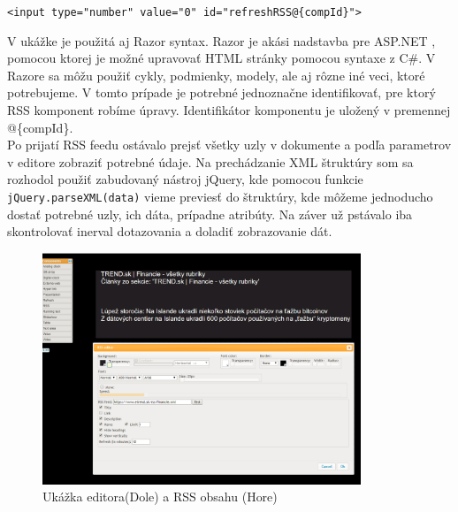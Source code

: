 \documentclass[11pt, oneside]{report}
\begin{document}
\begin{center}
\lstset{language=HTML5}
\lstinline!<input type="number" value="0" id="refreshRSS@{compId}">!\\
\end{center}
V ukážke je použitá aj Razor syntax. Razor je  akási nadstavba pre ASP.NET , pomocou ktorej je možné upravovať HTML stránky pomocou syntaxe z C\#. V Razore  sa môžu použiť cykly, podmienky, modely, ale aj rôzne iné veci, ktoré potrebujeme. V tomto prípade je potrebné jednoznačne identifikovať, pre ktorý RSS komponent robíme úpravy. Identifikátor komponentu je uložený v premennej \textsf{@\{compId\}}.\\
Po prijatí RSS feedu ostávalo prejsť všetky uzly v dokumente a podľa parametrov v editore  zobraziť potrebné údaje. Na prechádzanie  XML štruktúry som sa rozhodol použiť zabudovaný nástroj jQuery, kde pomocou funkcie 
\lstset{language=Javascript}
\lstinline!jQuery.parseXML(data)!
vieme previesť  do štruktúry, kde môžeme jednoducho  dostať potrebné uzly, ich dáta, prípadne atribúty. Na záver už pstávalo iba skontrolovať inerval dotazovania a doladiť zobrazovanie  dát.
\begin{figure}[h]
    \centering
    \includegraphics[width=0.85\textwidth]{RSS}
    \caption{Ukážka editora(Dole) a RSS obsahu (Hore)}
    \label{fig:mesh1}
\end{figure}
\end{document}
